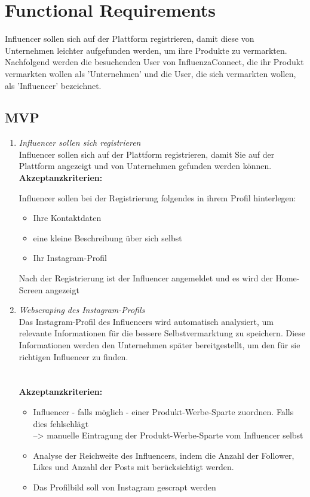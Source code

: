 \documentclass[conference,a4paper,flushend]{cs-techrep}
\begin{document}
\section{Functional Requirements}
Influencer sollen sich auf der Plattform registrieren, damit diese von Unternehmen leichter aufgefunden werden, um ihre Produkte zu vermarkten. Nachfolgend werden die besuchenden User von InfluenzaConnect, die ihr Produkt vermarkten wollen als 'Unternehmen' und die User, die sich vermarkten wollen, als 'Influencer' bezeichnet.



\subsection{MVP}
\begin{enumerate}
\item{\textit{Influencer sollen sich registrieren}\\
 Influencer sollen sich auf der Plattform registrieren, damit Sie auf der Plattform angezeigt und von Unternehmen gefunden werden können.\\
 \textbf{Akzeptanzkriterien:}

Influencer sollen bei der Registrierung folgendes in ihrem Profil hinterlegen:
\begin{itemize}
\item{Ihre Kontaktdaten}
\item{eine kleine Beschreibung über sich selbst}
\item{Ihr Instagram-Profil}
\end{itemize}
Nach der Registrierung ist der Influencer angemeldet und es wird der Home-Screen angezeigt\\}



\item{\textit{Webscraping des Instagram-Profils}\\
Das Instagram-Profil des Influencers wird automatisch analysiert, um relevante Informationen für die bessere Selbstvermarktung zu speichern. Diese Informationen werden den Unternehmen später bereitgestellt, um den für sie richtigen Influencer zu finden. \\
\\
\\
\textbf{Akzeptanzkriterien:}
\begin{itemize}
\item{Influencer - falls möglich - einer Produkt-Werbe-Sparte zuordnen. Falls dies fehlschlägt\\
--> manuelle Eintragung der Produkt-Werbe-Sparte vom Influencer selbst}
\item{Analyse der Reichweite des Influencers, indem die Anzahl der Follower, Likes und Anzahl der Posts mit berücksichtigt werden.}
\item{Das Profilbild soll von Instagram gescrapt werden\\}
\end{itemize}}


\end{enumerate}
\end{document}
